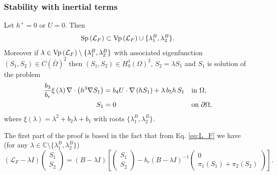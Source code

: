 \documentclass[10pt,aspectratio=169]{beamer}
\newcommand{\hzero}{H^1_0\left(\Omega\right)}
\newcommand{\cont}{C\left(\bar{\Omega}\right)}
\newcommand{\Sp}[1]{\textnormal{Sp}\left(#1\right)}
\newcommand{\Vp}[1]{\textnormal{Vp}\left(#1\right)}
\begin{document}
\begin{frame}
\frametitle{Stability with inertial terms}
\begin{lemma}\label{lemma:spec-L_F}
	Let $h^+=0$ or $U=0$. Then
	\begin{equation}
	\Sp{\mathcal{L}_F}\subset \Vp{\mathcal{L}_F}\cup \{\lambda_1^B,\lambda_2^B\}.
	\end{equation}
	Moreover if $\lambda\in \Vp{\mathcal{L}_F}\setminus\{\lambda_1^B,\lambda_2^B\}$ with associated eigenfunction $\left(S_1,S_2\right)\in\cont^2$ then $\left(S_1,S_2\right)\in\hzero^2$, $S_2=\lambda S_1$ and $S_1$ is solution of the problem
	\begin{align*}
	\frac{b_3}{b_r}\xi\left(\lambda\right)\nabla\cdot\left(h^3\nabla S_1\right)&=b_4 U\cdot\nabla\left(hS_1\right)+\lambda\, b_5 h\, S_1 && \textnormal{in }\Omega,\\
	S_1&=0&&\textnormal{on }\partial\Omega,
	\end{align*}
	where $\xi\left(\lambda\right)=\lambda^2+b_2\lambda+b_1$ with roots $\{\lambda_1^B,\lambda_2^B\}$.
\end{lemma}
The first part of the proof is based in the fact that from Eq. \eqref{eq:L_F} we have (for any $\lambda\in \mathbb{C}\setminus \{\lambda_1^B,\lambda_2^B\}$)
\begin{equation*}
\left(\mathcal{L}_F-\lambda I\right)\begin{pmatrix}
S_1\\S_2
\end{pmatrix}=\left(B-\lambda I\right)\left[\begin{pmatrix}
S_1\\S_2
\end{pmatrix}-b_r\left(B-\lambda I\right)^{-1}
\begin{pmatrix}
0\\ \pi_1\left(S_1\right)+\pi_2\left(S_2\right)
\end{pmatrix}	
\right].\label{eq:vp-L}
\end{equation*}	
\end{frame}

\end{document}
